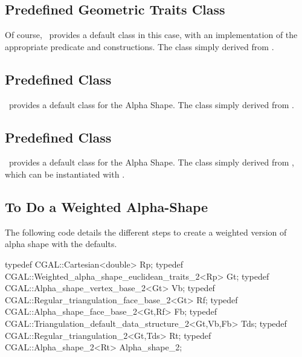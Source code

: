 
\subsection*{Predefined Geometric Traits Class}

Of course,  \cgal\ provides a default  class in this
case, with an implementation of the appropriate predicate and constructions.
The class  simply derived from 
.


\subsection*{Predefined \protect {} Class}

\cgal\ provides a default  class
for the Alpha Shape. The class
 simply derived from 
.


\subsection*{Predefined \protect {} Class}

\cgal\ provides a default  class
for the Alpha Shape. The class
 simply derived from 
, which can be instantiated with .



\subsection*{To Do a Weighted Alpha-Shape}

\ccExample
The following code details the different steps to create 
a weighted version of alpha shape with the defaults.

\begin{cprog}
typedef CGAL::Cartesian<double> Rp;
typedef CGAL::Weighted_alpha_shape_euclidean_traits_2<Rp> Gt;
typedef CGAL::Alpha_shape_vertex_base_2<Gt> Vb;
typedef CGAL::Regular_triangulation_face_base_2<Gt> Rf;
typedef CGAL::Alpha_shape_face_base_2<Gt,Rf>  Fb;
typedef CGAL::Triangulation_default_data_structure_2<Gt,Vb,Fb> Tds;
typedef CGAL::Regular_triangulation_2<Gt,Tds> Rt;
typedef CGAL::Alpha_shape_2<Rt> Alpha_shape_2;
\end{cprog}

